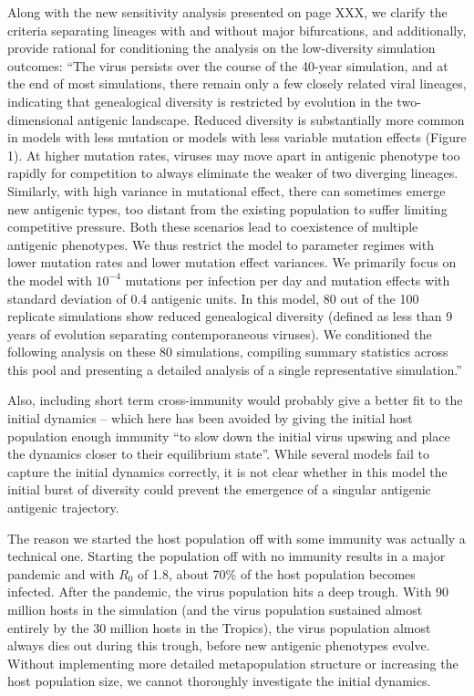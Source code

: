 \documentclass[11pt,oneside,letterpaper]{article}
\def\comment#1{
#1
}
\def\response#1{
\begin{bf}
#1
\end{bf}
}
\def\break{\vspace{0.2cm}}
\begin{document}
\response{Along with the new sensitivity analysis presented on page XXX, we clarify the criteria separating lineages with and without major bifurcations, and additionally, provide rational for conditioning the analysis on the low-diversity simulation outcomes: ``The virus persists over the course of the 40-year simulation, and at the end of most simulations, there remain only a few closely related viral lineages, indicating that genealogical diversity is restricted by evolution in the two-dimensional antigenic landscape.  Reduced diversity is substantially more common in models with less mutation or models with less variable mutation effects (Figure 1).  At higher mutation rates, viruses may move apart in antigenic phenotype too rapidly for competition to always eliminate the weaker of two diverging lineages.  Similarly, with high variance in mutational effect, there can sometimes emerge new antigenic types, too distant from the existing population to suffer limiting competitive pressure.  Both these scenarios lead to coexistence of multiple antigenic phenotypes.  We thus restrict the model to parameter regimes with lower mutation rates and lower mutation effect variances.  We primarily focus on the model with $10^{-4}$ mutations per infection per day and mutation effects with standard deviation of 0.4 antigenic units.  In this model, 80 out of the 100 replicate simulations show reduced genealogical diversity (defined as less than 9 years of evolution separating contemporaneous viruses).  We conditioned the following analysis on these 80 simulations, compiling summary statistics across this pool and presenting a detailed analysis of a single representative simulation.''}

\break

\comment{Also, including short term cross-immunity would probably give a better fit to the initial dynamics – which here has been avoided by giving the initial host population enough immunity ``to slow down the initial virus upswing and place the dynamics closer to their equilibrium state''. While several models fail to capture the initial dynamics correctly, it is not clear whether in this model the initial burst of diversity could prevent the emergence of a singular antigenic antigenic trajectory.}

\response{The reason we started the host population off with some immunity was actually a technical one.  Starting the population off with no immunity results in a major pandemic and with $R_0$ of 1.8, about 70\% of the host population becomes infected.  After the pandemic, the virus population hits a deep trough.  With 90 million hosts in the simulation (and the virus population sustained almost entirely by the 30 million hosts in the Tropics), the virus population almost always dies out during this trough, before new antigenic phenotypes evolve.  Without implementing more detailed metapopulation structure or increasing the host population size, we cannot thoroughly investigate the initial dynamics.}
\end{document}
